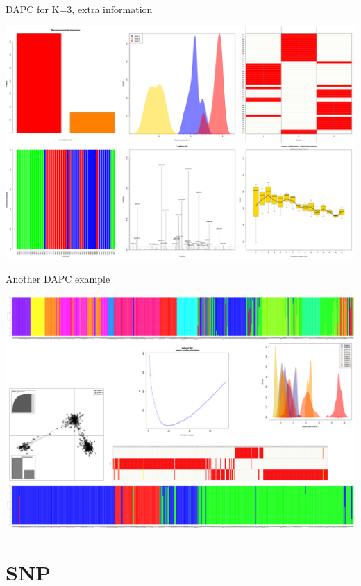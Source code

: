 \documentclass[compress, ucs, xelatex, 11pt, xcolor=svgnames,
  hyperref={
    bookmarks=true,
    unicode=true,
    colorlinks=true,
    pdftitle={Molecular data in R},
    plainpages=false,
    pdfauthor={Vojtech Zeisek},
    pdfsubject={Course about phylogeny and evolution in R},
    pdfcreator={XeLaTeX},
    pdfkeywords={R, evolution, phylogeny, molecular data},
    linkcolor=Tomato,
    anchorcolor=SaddleBrown,
    citecolor=Goldenrod,
    filecolor=DarkMagenta,
    menucolor=Sienna,
    urlcolor=DarkTurquoise,
    pdftex},
  url={hyphens, lowtilde} %
  ]{beamer}
\begin{document}
\begin{frame}{DAPC for K=3, extra information}
\begin{center}
  \includegraphics[width=\textwidth-1.5cm]{dapc3-extra.png}
\end{center}
\end{frame}

\begin{frame}{Another DAPC example}
\begin{center}
  \includegraphics[width=\textwidth-1.5cm]{dapc.png}
\end{center}
\end{frame}

\section{SNP}
\end{document}

